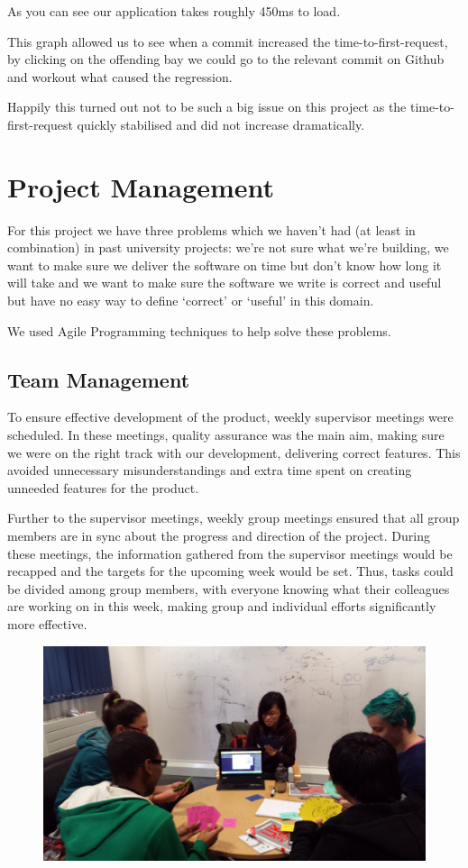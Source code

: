 \documentclass[11pt, a4paper]{article}
\begin{document}
\begin{description}
As you can see our application takes roughly 450ms to load.

This graph allowed us to see when a commit increased the time-to-first-request, by clicking on the offending bay we could go to the relevant commit on Github and workout what caused the regression.

Happily this turned out not to be such a big issue on this project as the time-to-first-request quickly stabilised and did not increase dramatically. 
\end{description}

\section{Project Management}
For this project we have three problems which we haven't had (at least in combination) in past university projects: we're not sure what we're building, we want to make sure we deliver the software on time but don't know how long it will take and
we want to make sure the software we write is correct and useful but have no easy way to define `correct' or `useful' in this domain.

We used Agile Programming techniques to help solve these problems.

\subsection{Team Management}

To ensure effective development of the product, weekly supervisor meetings were scheduled.
In these meetings, quality assurance was the main aim, making sure we were on the right track with our development, delivering correct features. 
This avoided unnecessary misunderstandings and extra time spent on creating unneeded features for the product. 

Further to the supervisor meetings, weekly group meetings ensured that all group members are in sync about the progress and direction of the project. 
During these meetings, the information gathered from the supervisor meetings would be recapped and the targets for the upcoming week would be set. 
Thus, tasks could be divided among group members, with everyone knowing what their colleagues are working on in this week, making group and individual efforts significantly more effective.
\begin{figure}[h!]
\centering
\includegraphics[width=130mm]{estimation.jpg}
\end{figure}
\end{document}
